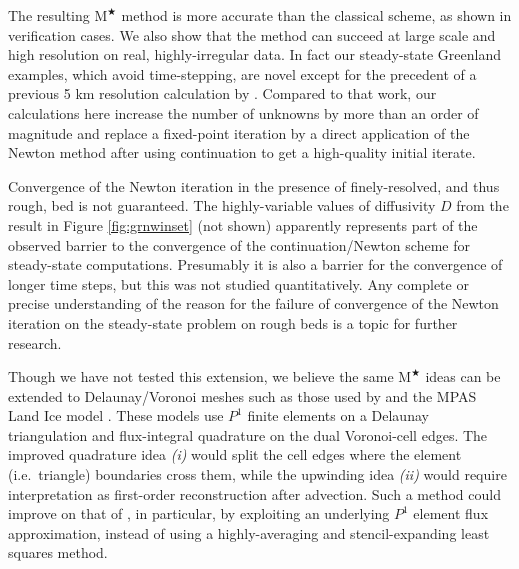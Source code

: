 \documentclass[twocolumn,a4paper]{igs}
\newcommand{\Mstar}{$\text{M}^{\bigstar}$\xspace}
\begin{document}
The resulting \Mstar method is more accurate than the classical scheme, as shown in verification cases.  We also show that the method can succeed at large scale and high resolution on real, highly-irregular data.  In fact our steady-state Greenland examples, which avoid time-stepping, are novel except for the precedent of a previous 5 km resolution calculation by \cite{JouvetBueler2012}.  Compared to that work, our calculations here increase the number of unknowns by more than an order of magnitude and replace a fixed-point iteration by a direct application of the Newton method after using continuation to get a high-quality initial iterate.

Convergence of the Newton iteration in the presence of finely-resolved, and thus rough, bed is not guaranteed.  The highly-variable values of diffusivity $D$ from the result in Figure \ref{fig:grnwinset} (not shown) apparently represents part of the observed barrier to the convergence of the continuation/Newton scheme for steady-state computations.  Presumably it is also a barrier for the convergence of longer time steps, but this was not studied quantitatively.  Any complete or precise understanding of the reason for the failure of convergence of the Newton iteration on the steady-state problem on rough beds is a topic for further research.

Though we have not tested this extension, we believe the same \Mstar ideas can be extended to Delaunay/Voronoi meshes such as those used by \cite{EgholmNielsen2010} and the MPAS Land Ice model \citep{MPASLandIce2013,Ringleretal2013}.  These models use $P^1$ finite elements on a Delaunay triangulation and flux-integral quadrature on the dual Voronoi-cell edges.  The improved quadrature idea \emph{(i)} would split the cell edges where the element (i.e.~triangle) boundaries cross them, while the upwinding idea \emph{(ii)} would require interpretation as first-order reconstruction after advection.  Such a method could improve on that of \cite{EgholmNielsen2010}, in particular, by exploiting an underlying $P^1$ element flux approximation, instead of using a highly-averaging and stencil-expanding least squares method.
\end{document}
